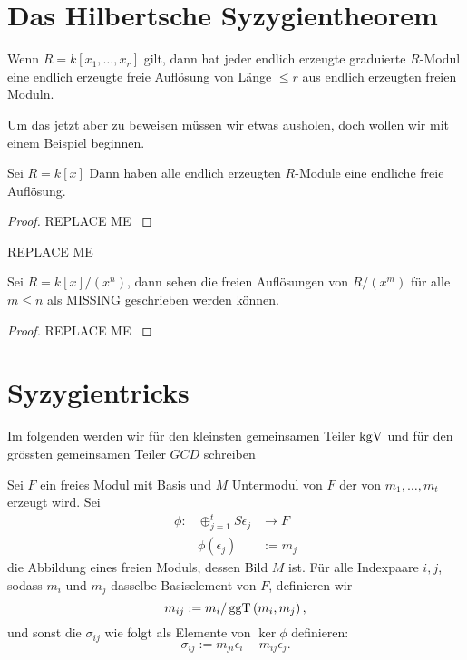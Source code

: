 \documentclass{article}
\begin{document}
\section{Das Hilbertsche Syzygientheorem}
	\begin{thm}
		Wenn 
		\( R = k \left[ x_1,\dots,x_r \right] \)
		gilt,
		dann hat jeder endlich erzeugte graduierte 
		\(R \)-Modul 
		eine endlich erzeugte freie Aufl\"osung von L\"ange 
		\( \le r \) 
		aus endlich erzeugten freien Moduln.
	\end{thm}
	Um das jetzt aber zu beweisen m\"ussen wir etwas ausholen, 
	doch wollen wir mit einem Beispiel beginnen.
	\begin{bsp}[\nocite{Eis1}{Exercise 1.22}]
		Sei 
		\( R = k\left[ x \right] \)
		Dann haben alle endlich erzeugten 
		\(R\)-Module 
		eine endliche freie Aufl\"osung.
		\begin{proof}
			{\color{red} REPLACE ME }		
		\end{proof}
	\end{bsp}	
	\begin{thm}
		{\color{red} REPLACE ME }	
	\end{thm}
	\begin{bsp}
		Sei 
		\( R= k\left[ x \right] \big/ \left( x^{n} \right) \),
		dann sehen die freien Aufl\"osungen von 
		\( R\big/ \left( x^{m} \right) \) 
		f\"ur alle 
		\( m \le n \)
		als 
		{\color{red}MISSING}
		geschrieben werden k\"onnen.
		\begin{proof}
			{\color{red} REPLACE ME }
		\end{proof}
	\end{bsp}
\section{Syzygientricks}
	\begin{defn}
		Im folgenden werden wir f\"ur den kleinsten gemeinsamen Teiler
		\( \operatorname{kgV} \)
		und f\"ur den gr\"ossten gemeinsamen Teiler
		\( GCD \)
		schreiben
	\end{defn}

	\begin{nota}
		Sei 
		\( F \) 
		ein freies Modul mit Basis 
		und
		\( M \)
		Untermodul von 
		\( F \)
		der von 
		\( m_{1} , \dots , m_{t} \)
		erzeugt wird.
		Sei
		\begin{align*}
			\phi:	& \oplus_{j=1}^{t} S\epsilon_{j} &\to   F \\
				& \phi\left( \epsilon_{j} \right) &:=  m_{j}
		\end{align*}
		die Abbildung eines freien Moduls, dessen Bild
		\( M \)
		ist.
		F\"ur alle Indexpaare 	
		\( i,j \),
		sodass 
		\( m_{i}\)
		und 
		\( m_{j}\)
		dasselbe Basiselement von 
		\( F \),
		definieren wir 
		\[
			m_{ij} := m_{i}/\operatorname{ggT}\left( m_{i},m_{j} \right) ,
		\]
		und sonst die 
		\( \sigma_{ij}\)
		wie folgt als Elemente von 
		\( \ker \phi \)
		definieren:
		\[
			\sigma_{ij} := m_{ji}\epsilon_{i}-m_{ij}\epsilon_{j} .
		\]

	\end{nota}
\end{document}
